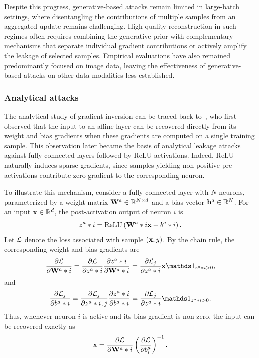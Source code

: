 Despite this progress, generative-based attacks remain limited in large-batch settings, where disentangling the contributions of multiple samples from an aggregated update remains challenging. High-quality reconstruction in such regimes often requires combining the generative prior with complementary mechanisms that separate individual gradient contributions or actively amplify the leakage of selected samples. Empirical evaluations have also remained predominantly focused on image data, leaving the effectiveness of generative-based attacks on other data modalities less established.

\subsubsection{Analytical attacks}
The analytical study of gradient inversion can be traced back
to~, who first observed that the input to an affine
layer can be recovered directly from its weight and bias gradients when
these gradients are computed on a single training sample. This observation later became the basis of analytical leakage attacks against fully connected layers followed by ReLU activations. Indeed, ReLU naturally induces sparse gradients, since samples yielding
non-positive pre-activations contribute zero gradient to the corresponding neuron.

To illustrate this mechanism, consider a fully connected layer with
$N$ neurons, parameterized by a weight matrix
$\mathbf{W}^{a} \in \mathbb{R}^{N \times d}$ and a bias vector
${\mathbf{b}}^{a} \in \mathbb{R}^{N}$. For an input
${\mathbf{x}} \in \mathbb{R}^{d}$, the post-activation output of neuron $i$ is
\begin{equation}
z^{a}*{i}
=
\operatorname{ReLU}
\left(
\mathbf{W}^{a}*{i}{\mathbf{x}}+b^{a}*{i}
\right).
\end{equation}
Let $\mathcal{L}$ denote the loss associated with sample
$({\mathbf{x}},y)$. By the chain rule, the corresponding weight and bias
gradients are
\begin{equation}
\frac{\partial \loss}{\partial \W^{a}*{i}}
=
\frac{\partial \loss}{\partial z^{a}*{i}}
\frac{\partial z^{a}*{i}}{\partial \W^{a}*{i}}
=
\frac{\partial \loss_j}{\partial z^{a}*{i}}
\x
\indicator_{z^{a}*{i}>0},
\end{equation}
and
\begin{equation}
\frac{\partial \loss_j}{\partial b^{a}*{i}}
=
\frac{\partial \loss_j}{\partial z^{a}*{i,j}}
\frac{\partial z^{a}*{i}}{\partial b^{a}*{i}}
=
\frac{\partial \loss_j}{\partial z^{a}*{i}}
\indicator_{z^{a}*{i}>0}.
\end{equation}
Thus, whenever neuron $i$ is active and its bias gradient is non-zero,
the input can be recovered exactly as
\begin{equation}
{\mathbf{x}}
=
\frac{\partial \mathcal{L}}{\partial \mathbf{W}^{a}*{i}}
\left(
\frac{\partial \mathcal{L}}{\partial b^{a}_{i}}
\right)^{-1}.
\end{equation}

